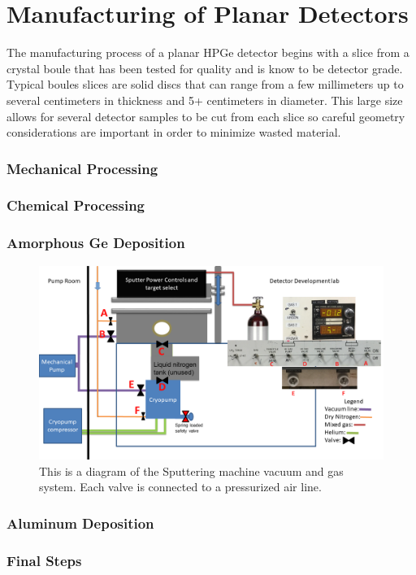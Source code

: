 \chapter{Manufacturing of Planar Detectors}
The manufacturing process of a planar HPGe detector begins with a slice from a crystal boule that has been tested for quality and is know to be detector grade. Typical boules slices are solid discs that can range from a few millimeters up to several centimeters in thickness and 5+ centimeters in diameter. This large size allows for several detector samples to be cut from each slice so careful geometry considerations are important in order to minimize wasted material.


\subsection{Mechanical Processing}

\subsection{Chemical Processing}

\subsection{Amorphous Ge Deposition}

\begin{figure}
\includegraphics[width=\textwidth]{figures/sput-flow}
\caption{This is a diagram of the Sputtering machine vacuum and gas system. Each valve is connected to a pressurized air line.}
\label{LandscapeFigure}
\end{figure}

\subsection{Aluminum Deposition}


\subsection{Final Steps}
